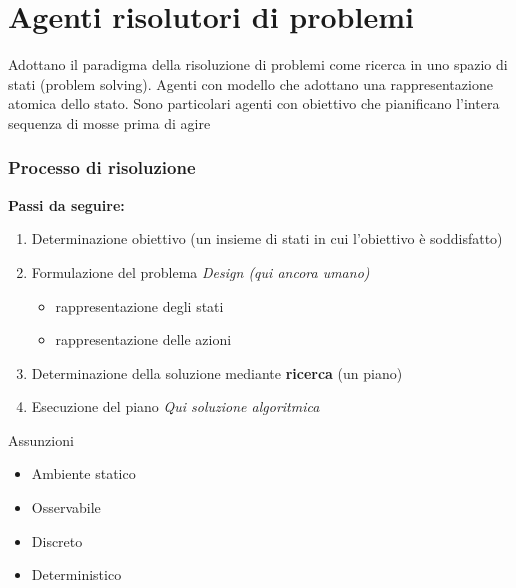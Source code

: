 \documentclass{article}
\begin{document}
\section{Agenti risolutori di problemi}
Adottano il paradigma della risoluzione di problemi come ricerca in uno spazio di stati (problem solving). Agenti con modello che adottano una rappresentazione atomica dello stato. Sono particolari agenti con obiettivo che pianificano l'intera sequenza di mosse prima di agire

\subsubsection{Processo di risoluzione}

\textbf{Passi da seguire:}
\begin{enumerate}
    \item Determinazione obiettivo (un insieme di stati in cui l'obiettivo è soddisfatto)
    \item Formulazione del problema \qquad \textit{Design (qui ancora umano)}
    \begin{itemize}
        \item rappresentazione degli stati
        \item rappresentazione delle azioni
    \end{itemize}
    \item Determinazione della soluzione mediante \textbf{ricerca} (un piano)
    \item Esecuzione del piano \qquad \textit{Qui soluzione algoritmica}
\end{enumerate}

Assunzioni
\begin{itemize}
    \item Ambiente statico
    \item Osservabile
    \item Discreto
    \item Deterministico
\end{itemize}
\end{document}
